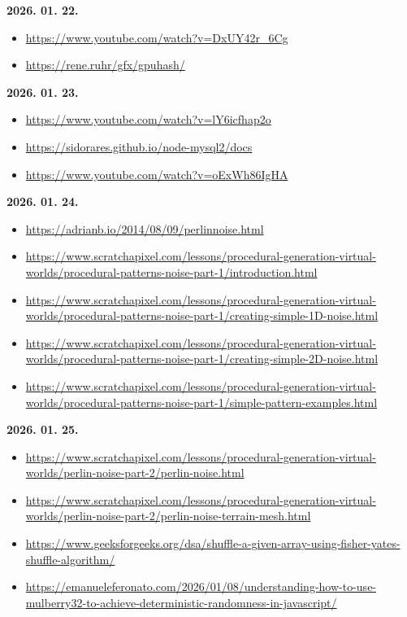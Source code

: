 \documentclass[12pt]{report}
\begin{document}
\noindent\textbf{2026. 01. 22.}
\begin{itemize}[left=0pt, topsep=0pt]
    \item \url{https://www.youtube.com/watch?v=DxUY42r_6Cg}
    \item \url{https://rene.ruhr/gfx/gpuhash/}
\end{itemize}

\noindent\textbf{2026. 01. 23.}
\begin{itemize}[left=0pt, topsep=0pt]
    \item \url{https://www.youtube.com/watch?v=lY6icfhap2o}
    \item \url{https://sidorares.github.io/node-mysql2/docs}
    \item \url{https://www.youtube.com/watch?v=oExWh86IgHA}
\end{itemize}

\noindent\textbf{2026. 01. 24.}
\begin{itemize}[left=0pt, topsep=0pt]
    \item \url{https://adrianb.io/2014/08/09/perlinnoise.html}
    \item \url{https://www.scratchapixel.com/lessons/procedural-generation-virtual-worlds/procedural-patterns-noise-part-1/introduction.html}
    \item \url{https://www.scratchapixel.com/lessons/procedural-generation-virtual-worlds/procedural-patterns-noise-part-1/creating-simple-1D-noise.html}
    \item \url{https://www.scratchapixel.com/lessons/procedural-generation-virtual-worlds/procedural-patterns-noise-part-1/creating-simple-2D-noise.html}
    \item \url{https://www.scratchapixel.com/lessons/procedural-generation-virtual-worlds/procedural-patterns-noise-part-1/simple-pattern-examples.html}
\end{itemize}

\noindent\textbf{2026. 01. 25.}
\begin{itemize}[left=0pt, topsep=0pt]
    \item \url{https://www.scratchapixel.com/lessons/procedural-generation-virtual-worlds/perlin-noise-part-2/perlin-noise.html}
    \item \url{https://www.scratchapixel.com/lessons/procedural-generation-virtual-worlds/perlin-noise-part-2/perlin-noise-terrain-mesh.html}
    \item \url{https://www.geeksforgeeks.org/dsa/shuffle-a-given-array-using-fisher-yates-shuffle-algorithm/}
    \item \url{https://emanueleferonato.com/2026/01/08/understanding-how-to-use-mulberry32-to-achieve-deterministic-randomness-in-javascript/}
\end{itemize}
\end{document}
